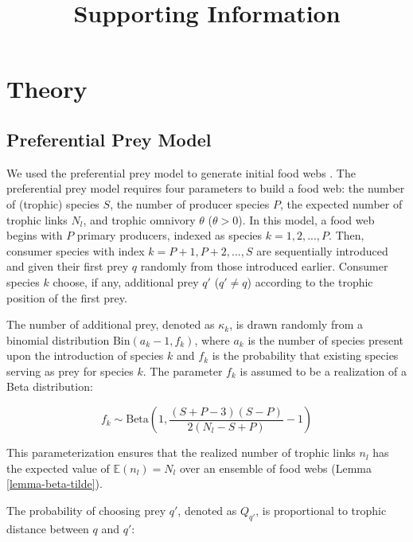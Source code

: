 \documentclass[11pt, class=article, crop=false]{standalone}
\title{Supporting Information}
\date{} %
\theoremstyle{definition}
\begin{document}
\renewcommand{\theequation}{S\arabic{equation}}
\renewcommand{\thetable}{S\arabic{table}}
\renewcommand{\thefigure}{S\arabic{figure}}

\maketitle

\tableofcontents

\newpage

\section{Theory}

\subsection{Preferential Prey Model}

We used the preferential prey model to generate initial food webs \citep{johnson_trophic_2014}.
The preferential prey model requires four parameters to build a food web: the number of (trophic) species $S$, the number of producer species $P$, the expected number of trophic links $N_l$, and trophic omnivory $\theta$ ($\theta > 0$).
In this model, a food web begins with $P$ primary producers, indexed as species $k = 1, 2, ..., P$.
Then, consumer species with index $k = P + 1, P + 2, ..., S$ are sequentially introduced and given their first prey $q$ randomly from those introduced earlier.
Consumer species $k$ choose, if any, additional prey $q'$ ($q' \ne q$) according to the trophic position of the first prey.

The number of additional prey, denoted as $\kappa_k$, is drawn randomly from a binomial distribution $\mbox{Bin}(a_k - 1, f_k)$, where $a_k$ is the number of species present upon the introduction of species $k$ and $f_k$ is the probability that existing species serving as prey for species $k$.
The parameter $f_k$ is assumed to be a realization of a Beta distribution:

\begin{equation}
    f_k \sim \mbox{Beta}\left(1, \frac{(S + P - 3)(S - P)}{2(N_l - S + P)} - 1\right)
\end{equation}

This parameterization ensures that the realized number of trophic links $n_l$ has the expected value of $\mathbb{E}(n_l) = N_l$ over an ensemble of food webs (Lemma \ref{lemma-beta-tilde}).

The probability of choosing prey $q'$, denoted as $Q_{q'}$, is proportional to trophic distance between $q$ and $q'$:
\end{document}
